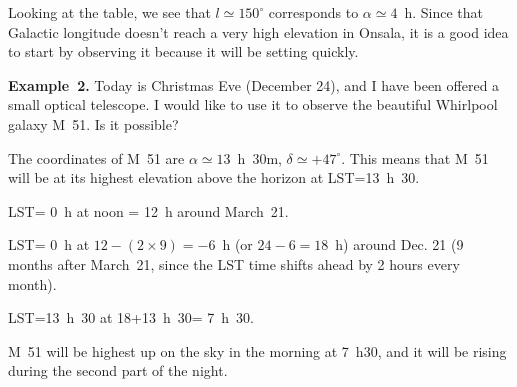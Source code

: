Looking at the table, we see that $l\simeq 150^\circ$ corresponds to $\alpha\simeq 4$~h. 
Since that Galactic longitude doesn't reach a very high elevation in Onsala, it is a 
good idea to start by observing it because it will be setting quickly. 

\bigskip
{\bf Example~2.} Today is Christmas Eve (December 24), and I have been offered a small optical
telescope. I would like to use it to observe the beautiful Whirlpool galaxy M~51. 
Is it possible? 

\smallskip
The coordinates of M~51 are $\alpha\simeq13$~h~30m, $\delta\simeq+47^\circ$. 
This means that M~51 will be at its highest elevation above the horizon at
LST=13~h~30. 

LST= 0~h at noon = 12~h around March~21. 

LST= 0~h at $12-(2\times 9) = -6$~h (or $24-6=18$~h) around Dec. 21 (9 months after March~21, 
since the LST time shifts ahead by 2 hours every month). 

LST=13~h~30 at 18+13~h~30= 7~h~30.  

M~51 will be highest up on the sky in the morning at 7~h30, and it will be rising during the
second part of the night. 




